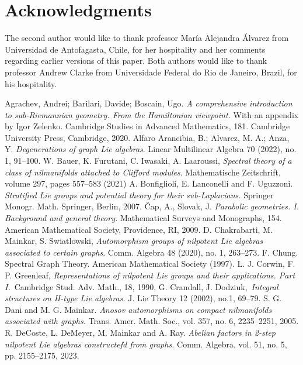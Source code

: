 \documentclass[12pt]{amsart}
\begin{document}
\section{Acknowledgments} 
The second author would like to thank professor Mar\'ia Alejandra \'Alvarez from Universidad de Antofagasta, Chile, for her hospitality and her comments regarding earlier versions of this paper. Both authors would like to thank professor Andrew Clarke from Universidade Federal do Rio de Janeiro, Brazil, for his hospitality.


\begin{thebibliography}{99}
	 Agrachev, Andrei; Barilari, Davide; Boscain, Ugo. {\it A comprehensive introduction to sub-Riemannian geometry. From the Hamiltonian viewpoint.} With an appendix by Igor Zelenko. Cambridge Studies in Advanced Mathematics, 181. Cambridge University Press, Cambridge, 2020.
	 Alfaro Arancibia, B.; Alvarez, M. A.; Anza, Y. {\it Degenerations of graph Lie algebras}. Linear Multilinear Algebra 70 (2022), no. 1, 91--100.
	 W. Bauer, K. Furutani, C. Iwasaki, A. Laaroussi, {\it Spectral theory of a class of nilmanifolds attached to Clifford modules}. Mathematische Zeitschrift, volume 297, pages 557--583 (2021)
	 A. Bonfiglioli, E. Lanconelli and F. Uguzzoni.  {\it Stratified Lie groups and potential theory for their sub-Laplacians.} Springer Monogr. Math. Springer, Berlin, 2007.
	 {\v C}ap, A., Slovak, J. {\it Parabolic geometries. I. Background and general theory.} Mathematical Surveys and Monographs, 154. American Mathematical Society, Providence, RI, 2009.
	 D. Chakrabarti, M. Mainkar, S. Swiatlowski, {\it Automorphism groups of nilpotent Lie algebras associated to certain graphs}.
Comm. Algebra 48 (2020), no. 1, 263–273.
	 F. Chung. Spectral Graph Theory. American Mathematical Society (1997).
	 L. J. Corwin, F. P. Greenleaf, {\it Representations of nilpotent Lie groups and their applications. Part I.} Cambridge Stud. Adv. Math., 18, 1990,
	 G. Crandall, J. Dodziuk, {\it Integral structures on H-type Lie algebras.} J. Lie Theory 12 (2002), no.1, 69--79.
	 S. G. Dani  and M. G. Mainkar. {\it Anosov automorphisms on compact nilmanifolds associated with graphs.} Trans. Amer. Math. Soc., vol. 357, no. 6, 2235--2251, 2005. 
 R. DeCoste, L. DeMeyer, M. Mainkar and A. Ray. {\it Abelian factors in 2-step nilpotent Lie algebras constructefd from graphs.} Comm. Algebra, vol. 51, no. 5, pp. 2155--2175, 2023.

\end{thebibliography}
\end{document}
